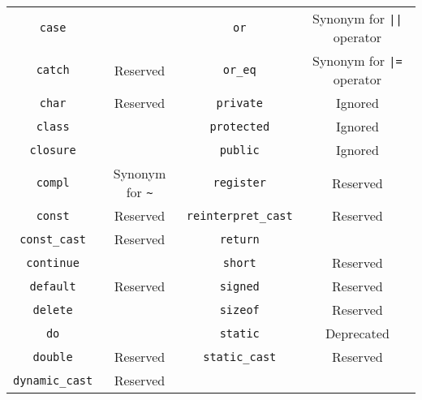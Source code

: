 \begin{table}[\floatpos]
\begin{tabular}{|c|c||c|c|}
    \lstinline"case"              &                                         &
    \lstinline"or"                & Synonym for \lstinline-||- operator     \\
    \lstinline"catch"             & Reserved                                &
    \lstinline"or_eq"             & Synonym for \lstinline-|=- operator     \\
    \lstinline"char"              & Reserved                                &
    \lstinline"private"           & Ignored                                 \\
    \lstinline"class"             &                                         &
    \lstinline"protected"         & Ignored                                 \\
    \lstinline"closure"           &                                         &
    \lstinline"public"            & Ignored                                 \\
    \lstinline"compl"             & Synonym for \lstinline|~|               &
    \lstinline"register"          & Reserved                                \\
    \lstinline"const"             & Reserved                                &
    \lstinline"reinterpret_cast"  & Reserved                               \\
    \lstinline"const_cast"        & Reserved                                &
    \lstinline"return"            &                                         \\
    \lstinline"continue"          &                                         &
    \lstinline"short"             & Reserved                                \\
    \lstinline"default"           & Reserved                                &
    \lstinline"signed"            & Reserved                                \\
    \lstinline"delete"            &                                         &
    \lstinline"sizeof"            & Reserved                                \\
    \lstinline"do"                &                                         &
    \lstinline"static"            & Deprecated                              \\
    \lstinline"double"            & Reserved                                &
    \lstinline"static_cast"       & Reserved                                \\
    \lstinline"dynamic_cast"      & Reserved                                &

\end{tabular}
\end{table}

